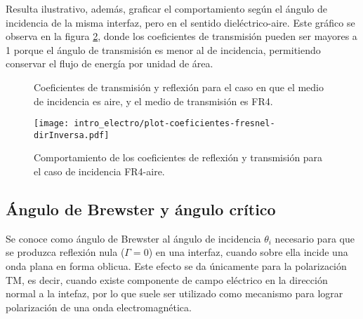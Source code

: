 Resulta ilustrativo, además, graficar el comportamiento según el ángulo de incidencia de la misma interfaz, pero en el sentido dieléctrico-aire. Este gráfico se observa en la figura \ref{fig:coeficientes-fr4-aire}, donde los coeficientes de transmisión pueden ser mayores a 1 porque el ángulo de transmisión es menor al de incidencia, permitiendo conservar el flujo de energía por unidad de área.

\begin{figure}[H]
	\centering 
	\caption{Coeficientes de transmisión y reflexión para el caso en que el medio de incidencia es aire, y el medio de transmisión es FR4.}
	\label{fig:coeficientes-aire-fr4}
\end{figure}


\begin{figure}[htp]
	\centering
	\texttt{[image: intro\_electro/plot-coeficientes-fresnel-dirInversa.pdf]}
	\caption{Comportamiento de los coeficientes de reflexión y transmisión para el caso de incidencia FR4-aire.}
	\label{fig:coeficientes-fr4-aire}
\end{figure}



\subsection{Ángulo de Brewster y ángulo crítico}

Se conoce como ángulo de Brewster al ángulo de incidencia $\theta_i$ necesario para que se produzca reflexión nula ($\Gamma = 0$) en una interfaz, cuando sobre ella incide una onda plana en forma oblicua. Este efecto se da únicamente para la polarización TM, es decir, cuando existe componente de campo eléctrico en la dirección normal a la intefaz, por lo que suele ser utilizado como mecanismo para lograr polarización de una onda electromagnética.

